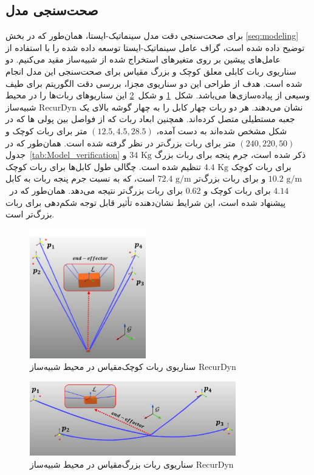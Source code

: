 \subsection{صحت‌سنجی مدل}
برای صحت‌سنجی دقت مدل سینماتیک-ایستا، همان‌طور که در بخش 
\ref{seq:modeling}
توضیح داده شده است، گراف عامل سینماتیک-ایستا توسعه داده شده را با استفاده از عامل‌های پیشین بر روی متغیرهای استخراج شده از شبیه‌ساز مقید می‌کنیم. دو سناریوی ربات کابلی معلق کوچک و بزرگ مقیاس برای صحت‌سنجی این مدل انجام شده است. هدف از طراحی این دو سناریوی مجزا، بررسی دقت الگوریتم برای طیف وسیعی از پیاده‌سازی‌ها می‌باشد. شکل~\ref{fig:recurdyn_small} و شکل~\ref{fig:recurdyn_large} این سناریوهای ربات‌ها را در محیط شبیه‌ساز RecurDyn نشان می‌دهند. هر دو ربات چهار کابل را به چهار گوشه بالای یک جعبه مستطیلی  متصل کرده‌اند. همچنین ابعاد ربات که از فواصل بین پولی ها که در شکل مشخص شده‌اند به دست آمده، $(12.5, 4.5, 28.5)$ متر برای ربات کوچک و $(240, 220, 50)$ متر برای ربات بزرگ‌تر در نظر گرفته شده است. همان‌طور که در جدول~\ref{tab:Model_verification} ذکر شده است، جرم پنجه برای ربات بزرگ $34 \text{ Kg}$ و برای ربات کوچک $4.4 \text{ Kg}$ تنظیم شده است. چگالی طول کابل‌ها برای ربات کوچک $10.2 \text{ g/m}$ و برای ربات بزرگ‌تر $72.4 \text{ g/m}$ است، که به نسبت جرم پنجه ربات به کابل $4.14$ برای ربات کوچک و $0.62$ برای ربات بزرگ‌تر نتیجه می‌دهد. همان‌طور که در~\cite{pott2013cable} پیشنهاد شده است، این شرایط نشان‌دهنده تأثیر قابل توجه شکم‌دهی برای ربات بزرگ‌تر است.

\begin{figure} [t]
	\centering
	\includegraphics[width=0.45\textwidth]{img/E2_small.pdf}
	\caption{سناریوی ربات کوچک‌مقیاس در محیط شبیه‌ساز RecurDyn}
	\label{fig:recurdyn_small}
\end{figure}

\begin{figure} [b]
	\centering
	\includegraphics[width=0.8\textwidth]{img/E1_large.pdf}
	\caption{سناریوی ربات بزرگ‌مقیاس در محیط شبیه‌ساز RecurDyn}
	\label{fig:recurdyn_large}
\end{figure}

